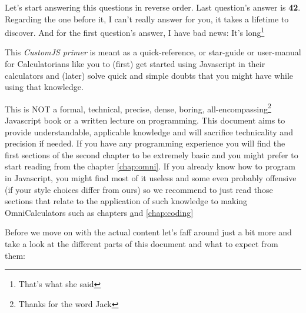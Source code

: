 \documentclass[11pt,a4paper,oldfontcommands]{memoir}
\begin{document}
    \label{preface}

    Let's start answering this questions in reverse order. Last question's answer is \textbf{42}. Regarding the one before it, I can't really answer for you, it takes a lifetime to discover. And for the first question's answer, I have bad news: It's long\footnote{That's what she said}

    This \textit{CustomJS primer} is meant as a quick-reference, or star-guide or user-manual for Calculatorians like you to (first) get started using Javascript in their calculators and (later) solve quick and simple doubts that you might have while using that knowledge.

This is NOT a formal, technical, precise, dense, boring, all-encompassing\footnote{Thanks for the word Jack} Javascript book or a written lecture on programming. This document aims to provide understandable, applicable knowledge and will sacrifice technicality and precision if needed. 
If you have any programming experience you will find the first sections of the second chapter to be extremely basic and you might prefer to start reading from the chapter \ref{chap:omni}. If you already know how to program in Javascript, you might find most of it useless and some even probably offensive (if your style choices differ from ours) so we recommend to just read those sections that relate to the application of such knowledge to making OmniCalculators such as chapters \href{chap:omni} and \ref{chap:coding}

Before we move on with the actual content let's faff around just a bit more and take a look at the different parts of this document and what to expect from them:

\iffalse
\begin{itemize}
    \item Chapter 1.- \textbf{Before you start} 
        \subitem Section 1.1 - A brief description of that is CustomJS what it does and how and when to use it
        \subitem Section 1.2 - Quick overview of the functions specific to omni that don't exist in regular JS
        \subitem Section 1.3 - A \textit{Gepe-complete}\footnote{\textit{Gepe-complete} Refers to an item that's been deemed complete by Alvaro Diez} start guide to get you started in programming from scratch, plus some additions relevant to CustomJS at Omni
        \subitem Section 1.4 - A collection of \textit{rules} that we have in place at Omni and their reasons to exist
    \item Chapter 2.- \textbf{Okay so you are already coding...}
        \subitem Section 2.1 - Basic and advance use cases in Custom JS with strong focus on Omni functions
        \subitem Section 2.2 - How to prevent errors and what to do when they happen
        \subitem Section 2.3 - Style guide as agreed by most of Omni Calculatorians. Follow or be bullied.
\end{itemize}
\fi
\end{document}
